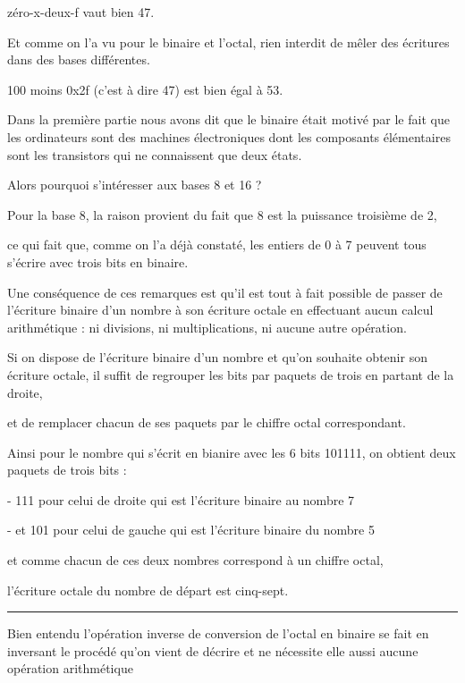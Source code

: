 zéro-x-deux-f vaut bien 47.

\change

Et comme on l'a vu pour le binaire et l'octal, rien interdit de mêler des écritures dans des bases différentes.

100 moins 0x2f (c'est à dire 47) est bien égal à 53. 


\diapo %


Dans la première partie nous avons dit que le binaire était motivé par le fait que les ordinateurs sont des machines électroniques dont les composants élémentaires sont les transistors qui ne connaissent que deux états.

Alors pourquoi s'intéresser aux bases 8 et 16 ?


\change
Pour la base 8, la raison provient du fait que 8 est la puissance troisième de 2,

\change
ce qui fait que, comme on l'a déjà constaté, les entiers de 0 à 7 peuvent tous s'écrire avec trois bits en binaire.

\change
Une conséquence de ces remarques est qu'il est tout à fait possible de passer de l'écriture binaire d'un nombre à son écriture octale en effectuant aucun calcul arithmétique : ni divisions, ni multiplications, ni aucune autre opération.



\change

Si on dispose de l'écriture binaire d'un nombre et qu'on souhaite obtenir son écriture octale, il suffit de regrouper les bits par paquets de trois en partant de la droite,

\change

et de remplacer chacun de ses paquets par le chiffre octal correspondant.

\change

Ainsi pour le nombre qui s'écrit en bianire avec les 6 bits 101111, on obtient deux paquets de trois bits :

- 111 pour celui de droite qui est l'écriture binaire au nombre 7

- et 101 pour celui de gauche qui est l'écriture binaire du nombre 5
 
et comme chacun de ces deux nombres correspond à un chiffre octal,

l'écriture octale du nombre de départ est cinq-sept.

\hrule\medskip
Bien entendu l'opération inverse de conversion de l'octal en binaire se fait en inversant le procédé qu'on vient de décrire et ne nécessite elle aussi aucune opération arithmétique



